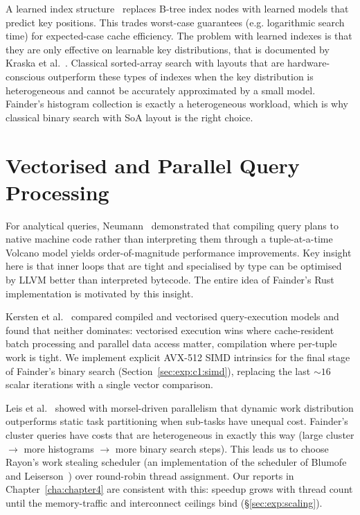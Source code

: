 A learned index structure~\cite{kraska_2018} replaces B-tree index nodes with learned models that predict key positions. This trades worst-case guarantees (e.g. logarithmic search time) for expected-case cache efficiency. The problem with learned indexes is that they are only effective on learnable key distributions, that is documented by Kraska et al.~\cite{kraska_2018}. Classical sorted-array search with layouts that are hardware-conscious outperform these types of indexes when the key distribution is heterogeneous and cannot be accurately approximated by a small model. Fainder's histogram collection is exactly a heterogeneous workload, which is why classical binary search with SoA layout is the right choice.


\section{Vectorised and Parallel Query Processing}

For analytical queries, Neumann~\cite{neumann_2011} demonstrated that compiling query plans to native machine code rather than interpreting them through a tuple-at-a-time Volcano model yields order-of-magnitude performance improvements. Key insight here is that inner loops that are tight and specialised by type can be optimised by LLVM better than interpreted bytecode. The entire idea of Fainder's Rust implementation is motivated by this insight.

Kersten et al.~\cite{kersten_2018} compared compiled and vectorised query-execution models and found that neither dominates: vectorised execution wins where cache-resident batch processing and parallel data access matter, compilation where per-tuple work is tight. We implement explicit AVX-512 SIMD intrinsics for the final stage of Fainder's binary search (Section~\ref{sec:exp:c1:simd}), replacing the last ${\sim}16$ scalar iterations with a single vector comparison.

Leis et al.~\cite{leis_2014} showed with morsel-driven parallelism that dynamic work distribution outperforms static task partitioning when sub-tasks have unequal cost. Fainder's cluster queries have costs that are heterogeneous in exactly this way (large cluster $\to$ more histograms $\to$ more binary search steps). This leads us to choose Rayon's work stealing scheduler (an implementation of the scheduler of Blumofe and Leiserson~\cite{blumofe_leiserson_1999}) over round-robin thread assignment. Our reports in Chapter~\ref{cha:chapter4} are consistent with this: speedup grows with thread count until the memory-traffic and interconnect ceilings bind (§\ref{sec:exp:scaling}).

